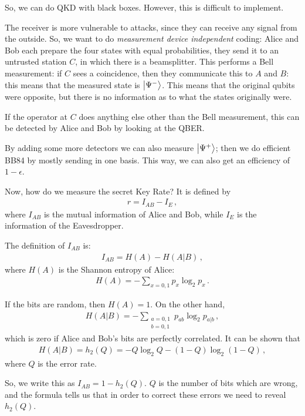 \documentclass[main.tex]{subfiles}
\begin{document}
So, we can do QKD with black boxes.
However, this is difficult to implement. 

The receiver is more vulnerable to attacks, since they can receive any signal from the outside. 
So, we want to do \emph{measurement device independent} coding: Alice and Bob each prepare the four states with equal probabilities, they send it to an untrusted station \(C\), in which there is a beamsplitter. 
This performs a Bell measurement: if \(C\) sees a coincidence, then they communicate this to \(A\) and \(B\): this means that the measured state is \(\ket{\Psi^{-}}\). This means that the original qubits were opposite, but there is no information as to what the states originally were. 

If the operator at \(C\) does anything else other than the Bell measurement, this can be detected by Alice and Bob by looking at the QBER. 

By adding some more detectors we can also measure \(\ket{\Psi^{+}}\); then we do efficient BB84 by mostly sending in one basis. 
This way, we can also get an efficiency of \(1- \epsilon \). 

Now, how do we measure the secret Key Rate? 
It is defined by 
%
\begin{align}
r = I_{AB} - I_E 
\,,
\end{align}
%
where \(I_{AB}\) is the mutual information of Alice and Bob, while \(I_E\) is the information of the Eavesdropper. 

The definition of \(I_{AB}\) is: 
%
\begin{align}
I_{AB} = H(A) - H(A|B)
\,,
\end{align}
%
where \(H(A)\) is the Shannon entropy of Alice: 
%
\begin{align}
H(A) = - \sum_{x = 0,1} p_x \log_2  p_x
\,.
\end{align}

If the bits are random, then \(H(A )= 1\). On the other hand, 
%
\begin{align}
H(A|B) = - \sum _{\substack{a=0,1 \\ b=0,1} } p_{ab} \log_2 p_{a|b}
\,,
\end{align}
%
which is zero if Alice and Bob's bits are perfectly correlated. It can be shown that 
%
\begin{align}
H(A|B) = h_2  (Q) = -Q \log_2 Q - (1-Q) \log_2 (1-Q)
\,,
\end{align}
%
where \(Q\) is the error rate. 

So, we write this as \(I_{AB} = 1 - h_2 (Q)\). 
\(Q\) is the number of bits which are wrong, and the formula tells us that in order to correct these errors we need to reveal \(h_2 (Q)\). 
\end{document}
